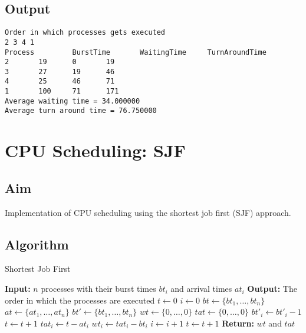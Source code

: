 \inputminted[fontsize=\footnotesize,autogobble]{c}{code/priority.c}

\pagebreak
\subsection{Output}
\begin{lstlisting}[style=output]
Order in which processes gets executed
2 3 4 1 
Process         BurstTime       WaitingTime     TurnAroundTime
2		19		0		19
3		27		19		46
4		25		46		71
1		100		71		171
Average waiting time = 34.000000
Average turn around time = 76.750000
\end{lstlisting}

\section{CPU Scheduling: SJF}

\subsection{Aim}
Implementation of CPU scheduling using the shortest job first (SJF) approach.

\subsection{Algorithm}

\begin{algorithm}
	\caption{Shortest Job First}
	\label{alg:sjf}
	\begin{algorithmic}[1]
		\State \textbf{Input:} $n$ processes with their burst times $bt_i$ and arrival times $at_i$
		\State \textbf{Output:} The order in which the processes are executed
		\State $t \gets 0$ 
		\State $i \gets 0$ 
		\State $bt \gets \{bt_1, \dots, bt_n\}$ 
		\State $at \gets \{at_1, \dots, at_n\}$ 
		\State $bt' \gets \{bt_1, \dots, bt_n\}$ 
		\State $wt \gets \{0, \dots, 0\}$ 
		\State $tat \gets \{0, \dots, 0\}$ 
			 
				\State $bt'_i \gets bt'_i - 1$
				\State $t \gets t + 1$
					\State $tat_i \gets t - at_i$
					\State $wt_i \gets tat_i - bt_i$
					\State $i \gets i + 1$
				\EndIf
				\Else
					\State $t \gets t + 1$
			\EndIf
		\EndWhile
		\State \textbf{Return:} $wt$ and $tat$
	\end{algorithmic}
\end{algorithm}

